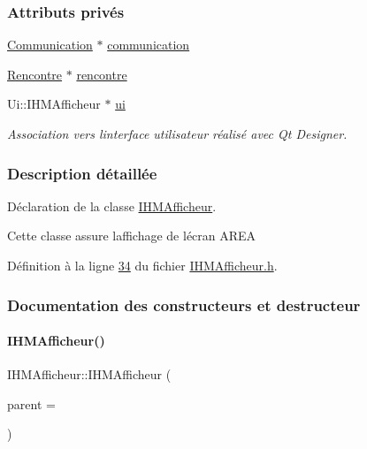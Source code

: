 \subsubsection*{Attributs privés}
\begin{DoxyCompactItemize}
\item 
\hyperlink{class_communication}{Communication} $\ast$ \hyperlink{class_i_h_m_afficheur_a331b5544e96cc908336a1486b52c379b}{communication}
\item 
\hyperlink{class_rencontre}{Rencontre} $\ast$ \hyperlink{class_i_h_m_afficheur_aef34d340f7ea30f049a98efc47bd9779}{rencontre}
\item 
Ui\+::\+I\+H\+M\+Afficheur $\ast$ \hyperlink{class_i_h_m_afficheur_a26ca43f1ff87b1caa2191adcce444d23}{ui}
\begin{DoxyCompactList}\small\item\em Association vers l\textquotesingle{}interface utilisateur réalisé avec Qt Designer. \end{DoxyCompactList}\end{DoxyCompactItemize}


\subsubsection{Description détaillée}
Déclaration de la classe \hyperlink{class_i_h_m_afficheur}{I\+H\+M\+Afficheur}. 

Cette classe assure l\textquotesingle{}affichage de l\textquotesingle{}écran A\+R\+EA 

Définition à la ligne \hyperlink{_i_h_m_afficheur_8h_source_l00034}{34} du fichier \hyperlink{_i_h_m_afficheur_8h_source}{I\+H\+M\+Afficheur.\+h}.



\subsubsection{Documentation des constructeurs et destructeur}
\mbox{\label{class_i_h_m_afficheur_a2fdf6626a1d9c2c635110a6e6ab703f9}} 
\paragraph{\texorpdfstring{I\+H\+M\+Afficheur()}{IHMAfficheur()}}
{\footnotesize\ttfamily I\+H\+M\+Afficheur\+::\+I\+H\+M\+Afficheur (\begin{DoxyParamCaption}\item[{Q\+Widget $\ast$}]{parent = {} }\end{DoxyParamCaption})\hspace{0.3cm}{\ttfamily [explicit]}}




